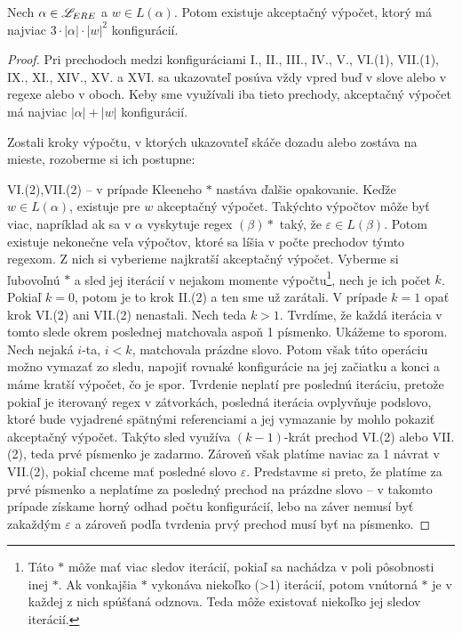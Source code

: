 \begin{lema}\label{dlzka_vypoctu_rw}
Nech $\alpha \in \mathscr{L}_{ERE}$ a $w \in L(\alpha)$. Potom existuje akceptačný výpočet, ktorý má najviac $3\cdot|\alpha|\cdot|w|^2$ konfigurácií.
\end{lema}
\begin{proof}
Pri prechodoch medzi konfiguráciami I., II., III., IV., V., VI.(1), VII.(1), IX., XI., XIV., XV. a XVI. sa ukazovateľ posúva vždy vpred buď v slove alebo v regexe alebo v oboch. Keby sme využívali iba tieto prechody, akceptačný výpočet má najviac $\left\vert{\alpha}\right\vert+|w|$ konfigurácií.

Zostali kroky výpočtu, v ktorých ukazovateľ skáče dozadu alebo zostáva na mieste, rozoberme si ich postupne:

VI.(2),VII.(2) -- v prípade Kleeneho $*$ nastáva ďalšie opakovanie. Keďže $w\in L(\alpha)$, existuje pre $w$ akceptačný výpočet. Takýchto výpočtov môže byť viac, napríklad ak sa v $\alpha$ vyskytuje regex $(\beta)*$ taký, že $\varepsilon \in L(\beta)$. Potom existuje nekonečne veľa výpočtov, ktoré sa líšia v počte prechodov týmto regexom. Z nich si vyberieme najkratší akceptačný výpočet. Vyberme si ľubovoľnú $*$ a sled jej iterácií v nejakom momente výpočtu\footnote{Táto $*$ môže mať viac sledov iterácií, pokiaľ sa nachádza v poli pôsobnosti inej $*$. Ak vonkajšia $*$ vykonáva niekoľko (>1) iterácií, potom vnútorná $*$ je v každej z nich spúšťaná odznova. Teda môže existovať niekoľko jej sledov iterácií.}, nech je ich počet $k$. Pokiaľ $k=0$, potom je to krok II.(2) a ten sme už zarátali. V prípade $k=1$ opať krok VI.(2) ani VII.(2) nenastali. Nech teda $k>1$. Tvrdíme, že každá iterácia v tomto slede okrem poslednej matchovala aspoň 1 písmenko. Ukážeme to sporom. Nech nejaká $i$-ta, $i<k$, matchovala prázdne slovo. Potom však túto operáciu možno vymazať zo sledu, napojiť rovnaké konfigurácie na jej začiatku a konci a máme kratší výpočet, čo je spor. Tvrdenie neplatí pre poslednú iteráciu, pretože pokiaľ je iterovaný regex v zátvorkách, posledná iterácia ovplyvňuje podslovo, ktoré bude vyjadrené spätnými referenciami a jej vymazanie by mohlo pokaziť akceptačný výpočet. Takýto sled využíva $(k-1)$-krát prechod VI.(2) alebo VII.(2), teda prvé písmenko je zadarmo. Zároveň však platíme naviac za 1 návrat v VII.(2), pokiaľ chceme mať posledné slovo $\varepsilon$. Predstavme si preto, že platíme za prvé písmenko a neplatíme za posledný prechod na prázdne slovo -- v takomto prípade získame horný odhad počtu konfigurácií, lebo na záver nemusí byť zakaždým $\varepsilon$ a zároveň podľa tvrdenia prvý prechod musí byť na písmenko.


\end{proof}
